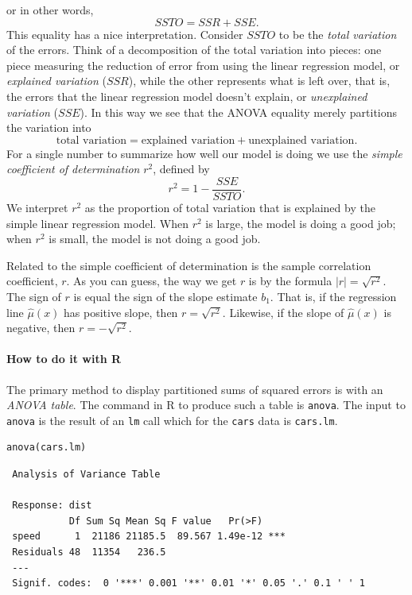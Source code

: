 \documentclass[captions=tableheading]{scrbook}
\begin{document}
or in other words,
\begin{equation}
SSTO=SSR+SSE.
\end{equation}
This equality has a nice interpretation. Consider \(SSTO\) to be the \emph{total variation} of the errors. Think of a decomposition of the total variation into pieces: one piece measuring the reduction of error from using the linear regression model, or \emph{explained variation} (\(SSR\)), while the other represents what is left over, that is, the errors that the linear regression model doesn't explain, or \emph{unexplained variation} (\(SSE\)). In this way we see that the ANOVA equality merely partitions the variation into 
\[
\mbox{total variation}=\mbox{explained variation}+\mbox{unexplained variation}.
\]
For a single number to summarize how well our model is doing we use the \emph{simple coefficient of determination} \(r^{2}\), defined by
\begin{equation}
r^{2}=1-\frac{SSE}{SSTO}.
\end{equation}
We interpret \(r^{2}\) as the proportion of total variation that is explained by the simple linear regression model. When \(r^{2}\) is large, the model is doing a good job; when \(r^{2}\) is small, the model is not doing a good job.

Related to the simple coefficient of determination is the sample correlation coefficient, \(r\). As you can guess, the way we get \(r\) is by the formula \(|r|=\sqrt{r^{2}}\). The sign of \(r\) is equal the sign of the slope estimate \(b_{1}\). That is, if the regression line \(\hat{\mu}(x)\) has positive slope, then \(r=\sqrt{r^{2}}\). Likewise, if the slope of \(\hat{\mu}(x)\) is negative, then \(r=-\sqrt{r^{2}}\).


\paragraph*{How to do it with \textsf{R}}

The primary method to display partitioned sums of squared errors is with an \emph{ANOVA table}. The command in \textsf{R} to produce such a table is \texttt{anova}. The input to \texttt{anova} is the result of an \texttt{lm} call which for the \texttt{cars} data is \texttt{cars.lm}.


\begin{verbatim}
anova(cars.lm)
\end{verbatim}

\begin{verbatim}
 Analysis of Variance Table
 
 Response: dist
           Df Sum Sq Mean Sq F value   Pr(>F)    
 speed      1  21186 21185.5  89.567 1.49e-12 ***
 Residuals 48  11354   236.5                     
 ---
 Signif. codes:  0 '***' 0.001 '**' 0.01 '*' 0.05 '.' 0.1 ' ' 1
\end{verbatim}
\end{document}
